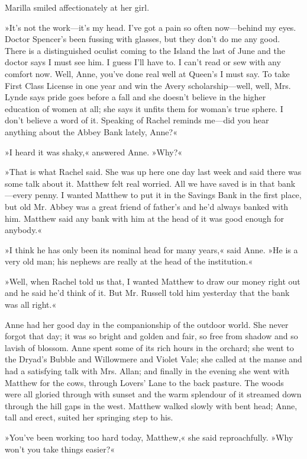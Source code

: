 Marilla smiled affectionately at her girl.

»It’s not the work—it’s my head. I’ve got a pain so often now—behind my eyes. Doctor Spencer’s been fussing with glasses, but they don’t do me any good. There is a distinguished oculist coming to the Island the last of June and the doctor says I must see him. I guess I’ll have to. I can’t read or sew with any comfort now. Well, Anne, you’ve done real well at Queen’s I must say. To take First Class License in one year and win the Avery scholarship—well, well, Mrs. Lynde says pride goes before a fall and she doesn’t believe in the higher education of women at all; she says it unfits them for woman’s true sphere. I don’t believe a word of it. Speaking of Rachel reminds me—did you hear anything about the Abbey Bank lately, Anne?«

»I heard it was shaky,« answered Anne. »Why?«

»That is what Rachel said. She was up here one day last week and said there was some talk about it. Matthew felt real worried. All we have saved is in that bank—every penny. I wanted Matthew to put it in the Savings Bank in the first place, but old Mr. Abbey was a great friend of father’s and he’d always banked with him. Matthew said any bank with him at the head of it was good enough for anybody.«

»I think he has only been its nominal head for many years,« said Anne. »He is a very old man; his nephews are really at the head of the institution.«

»Well, when Rachel told us that, I wanted Matthew to draw our money right out and he said he’d think of it. But Mr. Russell told him yesterday that the bank was all right.«

Anne had her good day in the companionship of the outdoor world. She never forgot that day; it was so bright and golden and fair, so free from shadow and so lavish of blossom. Anne spent some of its rich hours in the orchard; she went to the Dryad’s Bubble and Willowmere and Violet Vale; she called at the manse and had a satisfying talk with Mrs. Allan; and finally in the evening she went with Matthew for the cows, through Lovers’ Lane to the back pasture. The woods were all gloried through with sunset and the warm splendour of it streamed down through the hill gaps in the west. Matthew walked slowly with bent head; Anne, tall and erect, suited her springing step to his.

»You’ve been working too hard today, Matthew,« she said reproachfully. »Why won’t you take things easier?«

